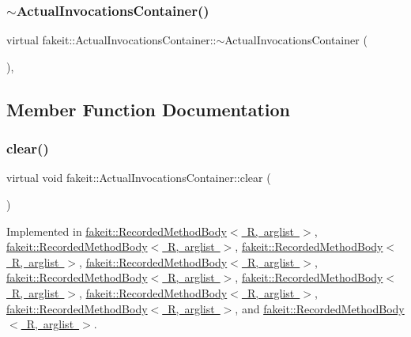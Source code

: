 \subsubsection{\texorpdfstring{$\sim$ActualInvocationsContainer()}{~ActualInvocationsContainer()}\hspace{0.1cm}{\footnotesize\ttfamily [9/9]}}
{\footnotesize\ttfamily virtual fakeit\+::\+Actual\+Invocations\+Container\+::$\sim$\+Actual\+Invocations\+Container (\begin{DoxyParamCaption}{ }\end{DoxyParamCaption})\hspace{0.3cm}{\ttfamily [inline]}, {\ttfamily [virtual]}}



\subsection{Member Function Documentation}
\mbox{\label{structfakeit_1_1ActualInvocationsContainer_ab0af1e59028b53f8258b713f89bfdcbe}} 
\subsubsection{\texorpdfstring{clear()}{clear()}\hspace{0.1cm}{\footnotesize\ttfamily [1/9]}}
{\footnotesize\ttfamily virtual void fakeit\+::\+Actual\+Invocations\+Container\+::clear (\begin{DoxyParamCaption}{ }\end{DoxyParamCaption})\hspace{0.3cm}{\ttfamily [pure virtual]}}



Implemented in \mbox{\hyperlink{classfakeit_1_1RecordedMethodBody_a6164a16c7813da2b7cd0d46568f1f1bc}{fakeit\+::\+Recorded\+Method\+Body$<$ R, arglist $>$}}, \mbox{\hyperlink{classfakeit_1_1RecordedMethodBody_a6164a16c7813da2b7cd0d46568f1f1bc}{fakeit\+::\+Recorded\+Method\+Body$<$ R, arglist $>$}}, \mbox{\hyperlink{classfakeit_1_1RecordedMethodBody_a6164a16c7813da2b7cd0d46568f1f1bc}{fakeit\+::\+Recorded\+Method\+Body$<$ R, arglist $>$}}, \mbox{\hyperlink{classfakeit_1_1RecordedMethodBody_a6164a16c7813da2b7cd0d46568f1f1bc}{fakeit\+::\+Recorded\+Method\+Body$<$ R, arglist $>$}}, \mbox{\hyperlink{classfakeit_1_1RecordedMethodBody_a6164a16c7813da2b7cd0d46568f1f1bc}{fakeit\+::\+Recorded\+Method\+Body$<$ R, arglist $>$}}, \mbox{\hyperlink{classfakeit_1_1RecordedMethodBody_a6164a16c7813da2b7cd0d46568f1f1bc}{fakeit\+::\+Recorded\+Method\+Body$<$ R, arglist $>$}}, \mbox{\hyperlink{classfakeit_1_1RecordedMethodBody_a6164a16c7813da2b7cd0d46568f1f1bc}{fakeit\+::\+Recorded\+Method\+Body$<$ R, arglist $>$}}, \mbox{\hyperlink{classfakeit_1_1RecordedMethodBody_a6164a16c7813da2b7cd0d46568f1f1bc}{fakeit\+::\+Recorded\+Method\+Body$<$ R, arglist $>$}}, and \mbox{\hyperlink{classfakeit_1_1RecordedMethodBody_a6164a16c7813da2b7cd0d46568f1f1bc}{fakeit\+::\+Recorded\+Method\+Body$<$ R, arglist $>$}}.

